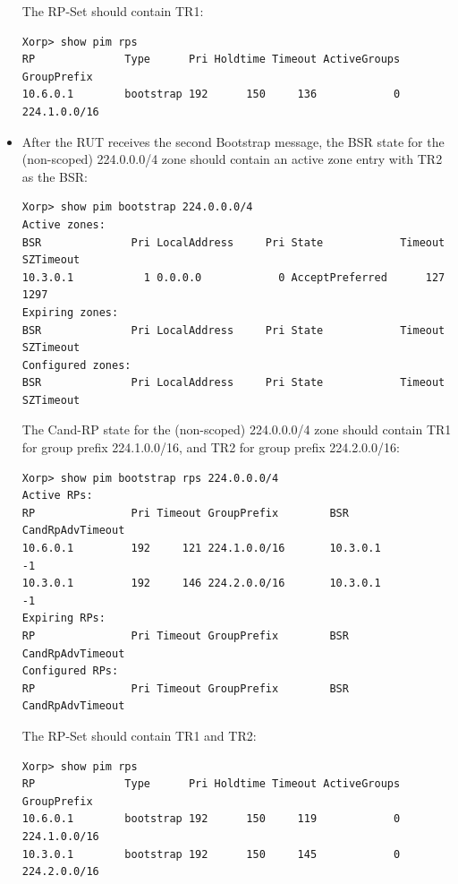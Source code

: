 \documentclass[11pt]{report}
\begin{document}
\begin{itemize}
  The RP-Set should contain TR1:

\begin{verbatim}
Xorp> show pim rps 
RP              Type      Pri Holdtime Timeout ActiveGroups GroupPrefix       
10.6.0.1        bootstrap 192      150     136            0 224.1.0.0/16      
\end{verbatim}

  \item After the RUT receives the second Bootstrap message, the BSR state for
  the (non-scoped) 224.0.0.0/4 zone should contain an active zone entry with
  TR2 as the BSR:

\begin{verbatim}
Xorp> show pim bootstrap 224.0.0.0/4
Active zones:
BSR              Pri LocalAddress     Pri State            Timeout SZTimeout
10.3.0.1           1 0.0.0.0            0 AcceptPreferred      127      1297
Expiring zones:
BSR              Pri LocalAddress     Pri State            Timeout SZTimeout
Configured zones:
BSR              Pri LocalAddress     Pri State            Timeout SZTimeout
\end{verbatim}

  The Cand-RP state for the (non-scoped) 224.0.0.0/4 zone should contain TR1
  for group prefix 224.1.0.0/16, and TR2 for group prefix  224.2.0.0/16:

\begin{verbatim}
Xorp> show pim bootstrap rps 224.0.0.0/4
Active RPs:
RP               Pri Timeout GroupPrefix        BSR         CandRpAdvTimeout
10.6.0.1         192     121 224.1.0.0/16       10.3.0.1                  -1
10.3.0.1         192     146 224.2.0.0/16       10.3.0.1                  -1
Expiring RPs:
RP               Pri Timeout GroupPrefix        BSR         CandRpAdvTimeout
Configured RPs:
RP               Pri Timeout GroupPrefix        BSR         CandRpAdvTimeout
\end{verbatim}

  The RP-Set should contain TR1 and TR2:

\begin{verbatim}
Xorp> show pim rps 
RP              Type      Pri Holdtime Timeout ActiveGroups GroupPrefix       
10.6.0.1        bootstrap 192      150     119            0 224.1.0.0/16      
10.3.0.1        bootstrap 192      150     145            0 224.2.0.0/16      
\end{verbatim}

\end{itemize}
\end{document}
